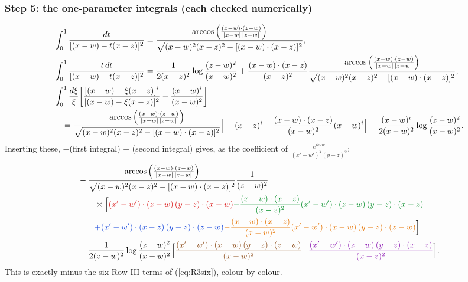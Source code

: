 \documentclass[9pt]{article}
\newcommand{\R}[1]{{\color{cR}#1}}
\newcommand{\B}[1]{{\color{cB}#1}}
\newcommand{\G}[1]{{\color{cG}#1}}
\newcommand{\Or}[1]{{\color{cO}#1}}
\newcommand{\Vi}[1]{{\color{cV}#1}}
\newcommand{\Br}[1]{{\color{cN}#1}}
\numberwithin{equation}{section}
\begin{document}
\subsubsection*{Step 5: the one-parameter integrals (each checked numerically)}
\begin{align}
&\int_{0}^{1}\frac{dt}{[(x-w)-t(x-z)]^{2}}=\frac{\arccos\Big(\frac{(x-w)\cdot(z-w)}{|x-w|\,|z-w|}\Big)}{\sqrt{(x-w)^{2}(x-z)^{2}-[(x-w)\cdot(x-z)]^{2}}},\notag\\
&\int_{0}^{1}\frac{t\,dt}{[(x-w)-t(x-z)]^{2}}=\frac{1}{2(x-z)^{2}}\log\frac{(z-w)^{2}}{(x-w)^{2}}+\frac{(x-w)\cdot(x-z)}{(x-z)^{2}}\frac{\arccos\Big(\frac{(x-w)\cdot(z-w)}{|x-w|\,|z-w|}\Big)}{\sqrt{(x-w)^{2}(x-z)^{2}-[(x-w)\cdot(x-z)]^{2}}},\notag\\
&\int_{0}^{1}\frac{d\xi}{\xi}\bigg[\frac{[(x-w)-\xi(x-z)]^{i}}{[(x-w)-\xi(x-z)]^{2}}-\frac{(x-w)^{i}}{(x-w)^{2}}\bigg]\notag\\
&\quad=\frac{\arccos\Big(\frac{(x-w)\cdot(z-w)}{|x-w|\,|z-w|}\Big)}{\sqrt{(x-w)^{2}(x-z)^{2}-[(x-w)\cdot(x-z)]^{2}}}\Big[-(x-z)^{i}+\frac{(x-w)\cdot(x-z)}{(x-w)^{2}}(x-w)^{i}\Big]-\frac{(x-w)^{i}}{2(x-w)^{2}}\log\frac{(z-w)^{2}}{(x-w)^{2}}.
\end{align}
Inserting these, $-$(first integral) $+$ (second integral) gives, as the coefficient of $\frac{e^{ik\cdot w}}{(x'-w')^{2}(y-z)^{2}}$:
\begin{align}
&-\frac{\arccos\Big(\frac{(x-w)\cdot(z-w)}{|x-w|\,|z-w|}\Big)}{\sqrt{(x-w)^{2}(x-z)^{2}-[(x-w)\cdot(x-z)]^{2}}}\frac{1}{(z-w)^{2}}\notag\\
&\qquad\times\Big[\R{(x'-w')\cdot(z-w)\,(y-z)\cdot(x-w)}\G{-\frac{(x-w)\cdot(x-z)}{(x-z)^{2}}(x'-w')\cdot(z-w)\,(y-z)\cdot(x-z)}\notag\\
&\qquad\B{+(x'-w')\cdot(x-z)\,(y-z)\cdot(z-w)}\Or{-\frac{(x-w)\cdot(x-z)}{(x-w)^{2}}(x'-w')\cdot(x-w)\,(y-z)\cdot(z-w)}\Big]\notag\\
&-\frac{1}{2(z-w)^{2}}\log\frac{(z-w)^{2}}{(x-w)^{2}}\Big[\Br{\frac{(x'-w')\cdot(x-w)\,(y-z)\cdot(z-w)}{(x-w)^{2}}}\Vi{-\frac{(x'-w')\cdot(z-w)\,(y-z)\cdot(x-z)}{(x-z)^{2}}}\Big].
\end{align}
This is exactly minus the six Row III terms of (\ref{eq:R3six}), colour by colour.
\end{document}
